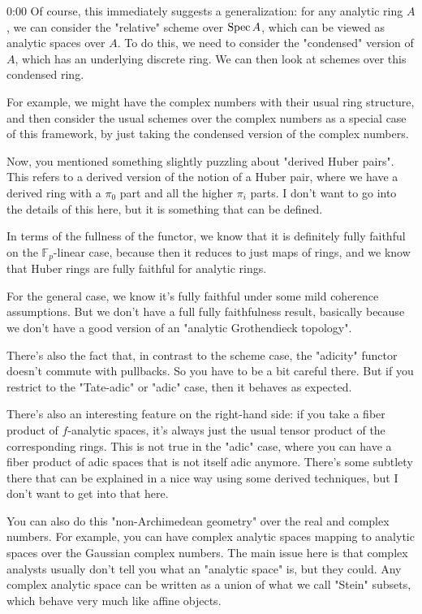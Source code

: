 \begin{unfinished}{0:00}
Of course, this immediately suggests a generalization: for any analytic ring $A$, we can consider the "relative" scheme over $\operatorname{Spec} A$, which can be viewed as analytic spaces over $A$. To do this, we need to consider the "condensed" version of $A$, which has an underlying discrete ring. We can then look at schemes over this condensed ring.

For example, we might have the complex numbers with their usual ring structure, and then consider the usual schemes over the complex numbers as a special case of this framework, by just taking the condensed version of the complex numbers.

Now, you mentioned something slightly puzzling about "derived Huber pairs". This refers to a derived version of the notion of a Huber pair, where we have a derived ring with a $\pi_0$ part and all the higher $\pi_i$ parts. I don't want to go into the details of this here, but it is something that can be defined.

In terms of the fullness of the functor, we know that it is definitely fully faithful on the $\mathbb{F}_p$-linear case, because then it reduces to just maps of rings, and we know that Huber rings are fully faithful for analytic rings.

For the general case, we know it's fully faithful under some mild coherence assumptions. But we don't have a full fully faithfulness result, basically because we don't have a good version of an "analytic Grothendieck topology".

There's also the fact that, in contrast to the scheme case, the "adicity" functor doesn't commute with pullbacks. So you have to be a bit careful there. But if you restrict to the "Tate-adic" or "adic" case, then it behaves as expected.

There's also an interesting feature on the right-hand side: if you take a fiber product of $f$-analytic spaces, it's always just the usual tensor product of the corresponding rings. This is not true in the "adic" case, where you can have a fiber product of adic spaces that is not itself adic anymore. There's some subtlety there that can be explained in a nice way using some derived techniques, but I don't want to get into that here.

You can also do this "non-Archimedean geometry" over the real and complex numbers. For example, you can have complex analytic spaces mapping to analytic spaces over the Gaussian complex numbers. The main issue here is that complex analysts usually don't tell you what an "analytic space" is, but they could. Any complex analytic space can be written as a union of what we call "Stein" subsets, which behave very much like affine objects.


\end{unfinished}
